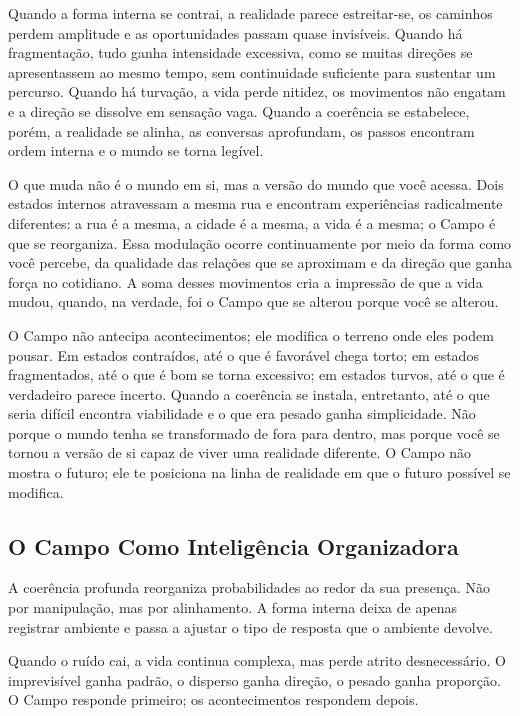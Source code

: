 \documentclass[12pt]{book}
\begin{document}
Quando a forma interna se contrai, a realidade parece estreitar-se, os caminhos perdem amplitude e as oportunidades passam quase invisíveis. Quando há fragmentação, tudo ganha intensidade excessiva, como se muitas direções se apresentassem ao mesmo tempo, sem continuidade suficiente para sustentar um percurso. Quando há turvação, a vida perde nitidez, os movimentos não engatam e a direção se dissolve em sensação vaga. Quando a coerência se estabelece, porém, a realidade se alinha, as conversas aprofundam, os passos encontram ordem interna e o mundo se torna legível.

O que muda não é o mundo em si, mas a versão do mundo que você acessa. Dois estados internos atravessam a mesma rua e encontram experiências radicalmente diferentes: a rua é a mesma, a cidade é a mesma, a vida é a mesma; o Campo é que se reorganiza. Essa modulação ocorre continuamente por meio da forma como você percebe, da qualidade das relações que se aproximam e da direção que ganha força no cotidiano. A soma desses movimentos cria a impressão de que a vida mudou, quando, na verdade, foi o Campo que se alterou porque você se alterou.

O Campo não antecipa acontecimentos; ele modifica o terreno onde eles podem pousar. Em estados contraídos, até o que é favorável chega torto; em estados fragmentados, até o que é bom se torna excessivo; em estados turvos, até o que é verdadeiro parece incerto. Quando a coerência se instala, entretanto, até o que seria difícil encontra viabilidade e o que era pesado ganha simplicidade. Não porque o mundo tenha se transformado de fora para dentro, mas porque você se tornou a versão de si capaz de viver uma realidade diferente. O Campo não mostra o futuro; ele te posiciona na linha de realidade em que o futuro possível se modifica.

\subsection*{O Campo Como Inteligência Organizadora}

A coerência profunda reorganiza probabilidades ao redor da sua presença. Não por manipulação, mas por alinhamento. A forma interna deixa de apenas registrar ambiente e passa a ajustar o tipo de resposta que o ambiente devolve.

Quando o ruído cai, a vida continua complexa, mas perde atrito desnecessário. O imprevisível ganha padrão, o disperso ganha direção, o pesado ganha proporção. O Campo responde primeiro; os acontecimentos respondem depois.
\end{document}
